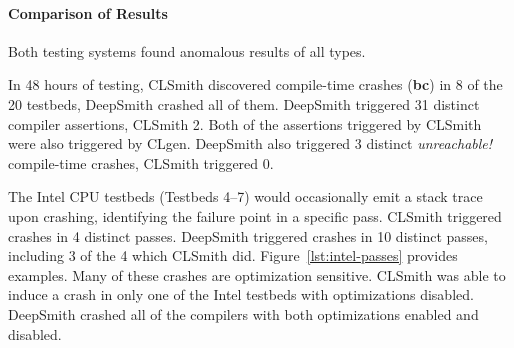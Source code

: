 



\paragraph{Comparison of Results} %
Both testing systems found anomalous results of all types.

In 48 hours of testing, CLSmith discovered compile-time crashes (\textbf{bc}) in 8 of the 20 testbeds, DeepSmith crashed all of them. DeepSmith triggered 31 distinct compiler assertions, CLSmith 2. Both of the assertions triggered by CLSmith were also triggered by CLgen. DeepSmith also triggered 3 distinct \emph{unreachable!} compile-time crashes, CLSmith triggered 0.

The Intel CPU testbeds (Testbeds 4--7) would occasionally emit a stack trace upon crashing, identifying the failure point in a specific pass. CLSmith triggered crashes in 4 distinct passes. DeepSmith triggered crashes in 10 distinct passes, including 3 of the 4 which CLSmith did. Figure~\ref{lst:intel-passes} provides examples. Many of these crashes are optimization sensitive. CLSmith was able to induce a crash in only one of the Intel testbeds with optimizations disabled. DeepSmith crashed all of the compilers with both optimizations enabled and disabled.


%

